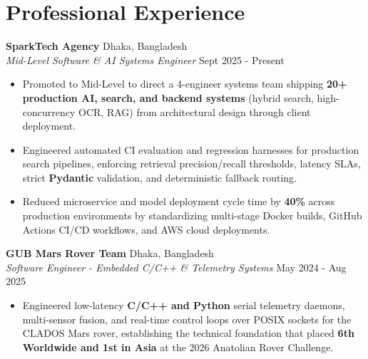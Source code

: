 \documentclass[9.5pt,a4paper]{article}
\begin{document}
\section*{Professional Experience}
\noindent
\textbf{SparkTech Agency} \hfill Dhaka, Bangladesh\\
\textit{Mid-Level Software \& AI Systems Engineer} \hfill Sept 2025 - Present
\begin{itemize}
    \item Promoted to Mid-Level to direct a 4-engineer systems team shipping \textbf{20+ production AI, search, and backend systems} (hybrid search, high-concurrency OCR, RAG) from architectural design through client deployment.
    \item Engineered automated CI evaluation and regression harnesses for production search pipelines, enforcing retrieval precision/recall thresholds, latency SLAs, strict \textbf{Pydantic} validation, and deterministic fallback routing.
    \item Reduced microservice and model deployment cycle time by \textbf{40\%} across production environments by standardizing multi-stage Docker builds, GitHub Actions CI/CD workflows, and AWS cloud deployments.
\end{itemize}
\vspace{0.6pt}
\noindent
\textbf{GUB Mars Rover Team} \hfill Dhaka, Bangladesh\\
\textit{Software Engineer - Embedded C/C++ \& Telemetry Systems} \hfill May 2024 - Aug 2025
\begin{itemize}
    \item Engineered low-latency \textbf{C/C++ and Python} serial telemetry daemons, multi-sensor fusion, and real-time control loops over POSIX sockets for the CLADOS Mars rover, establishing the technical foundation that placed \textbf{6th Worldwide and 1st in Asia} at the 2026 Anatolian Rover Challenge.
\end{itemize}
\vspace{0.6pt}
\end{document}
